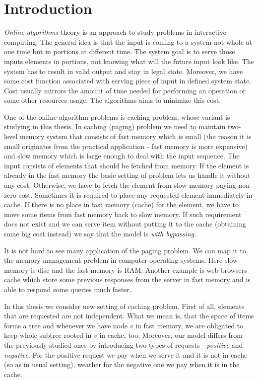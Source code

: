 \section{Introduction}
\textit{Online algorithms} theory is an approach to study problems in 
interactive computing. The general idea is that the input is coming to a 
system not  whole at one time but in portions at different time. The system 
goal is to serve those inputs elements in portions, not knowing what will the 
future input look like. The system has to result in valid output and stay in 
legal state. Moreover, we have some cost function associated with serving piece 
of input in defined system state. Cost usually mirrors the amount of time 
needed for performing an operation or some other resources usage. The 
algorithms aims to minimize this cost.

One of the online algorithm problems is caching problem, whose variant is 
studying in this thesis. In caching (paging) problem we need to maintain 
two-level memory system that consists of fast memory which is small (the reason 
it is small originates from the practical application - fast memory is more 
expensive) and slow memory which is large enough to deal with the input 
sequence. The input consists of elements that should be fetched from memory. If 
the element is already in the fast memory the basic setting of problem lets us 
handle it without any cost. Otherwise, we have to fetch the element from slow 
memory paying non-zero cost. Sometimes it is required to place any requested 
element immediately in cache. If there is no place in fast memory (cache) for 
the element, we have to move some items from fast memory back to slow memory. 
If such requirement does not exist and we can serve item without putting it to 
the cache (obtaining some big cost instead) we say that the model is 
\textit{with bypassing}.

It is not hard to see many application of the paging problem. We can map it to 
the memory management problem in computer operating systems. Here slow memory 
is disc and the fast memory is RAM. Another example is web browsers cache which 
store some previous responses from the server in fast memory and is able to 
respond some queries much faster.

In this thesis we consider new setting of caching problem. First of all, 
elements that are requested are not independent. What we mean is, that the 
space of items forms a tree and whenever we have node $v$ in fast memory, we 
are obligated to keep whole subtree rooted in $v$ in cache, too. Moreover, our 
model differs from the previously studied ones by introducing two types of 
requests - \textit{positive} and \textit{negative}. For the positive request we 
pay when we serve it and it is not in cache (so as in usual setting), weather 
for the negative one we pay when it is in the cache.

